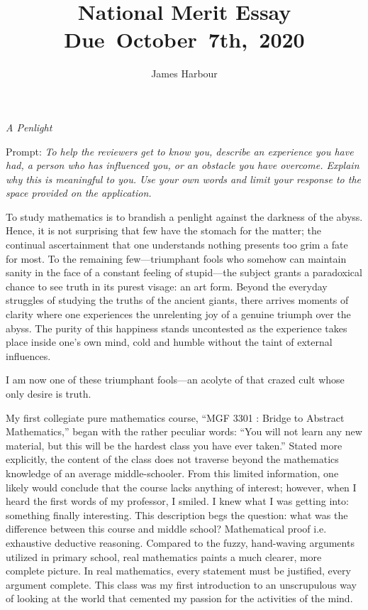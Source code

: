 \documentclass[12pt]{article}
\title{
    \vspace{2in}
    \textmd{\textbf{National Merit Essay}}\\
    \normalsize\vspace{0.1in}\small{Due\ October\ 7th,\ 2020}\\
    \vspace{3in}
}
\author{James Harbour}
\begin{document}
\maketitle
\pagebreak
 \begin{center}
   \emph{A Penlight}
 \end{center}
 Prompt: \emph{To help the reviewers get to know you, describe an experience you have had, a person who has influenced you, or an obstacle you have overcome. Explain why this is meaningful to you. Use your own words and limit your response to the space provided on the application.}
\raggedright\setlength{\parindent}{0.5in}

To study mathematics is to brandish a penlight against the darkness of the abyss. Hence, it is not surprising that few have the stomach for the matter; the continual ascertainment that one understands nothing presents too grim a fate for most. To the remaining few---triumphant fools who somehow can maintain sanity in the face of a constant feeling of stupid---the subject grants a paradoxical chance to see truth in its purest visage: an art form. Beyond the everyday struggles of studying the truths of the ancient giants, there arrives moments of clarity where one experiences the unrelenting joy of a genuine triumph over the abyss. The purity of this happiness stands uncontested as the experience takes place inside one's own mind, cold and humble without the taint of external influences.

I am now one of these triumphant fools---an acolyte of that crazed cult whose only desire is truth.

My first collegiate pure mathematics course, ``MGF 3301 : Bridge to Abstract Mathematics,'' began with the rather peculiar words: ``You will not learn any new material, but this will be the hardest class you have ever taken.'' Stated more explicitly, the content of the class does not traverse beyond the mathematics knowledge of an average middle-schooler. From this limited information, one likely would conclude that the course lacks anything of interest; however, when I heard the first words of my professor, I smiled. I knew what I was getting into: something finally interesting. This description begs the question: what was the difference between this course and middle school? Mathematical proof i.e. exhaustive deductive reasoning. Compared to the fuzzy, hand-waving arguments utilized in primary school, real mathematics paints a much clearer, more complete picture. In real mathematics, every statement must be justified, every argument complete. This class was my first introduction to an unscrupulous way of looking at the world that cemented my passion for the activities of the mind.
\end{document}
